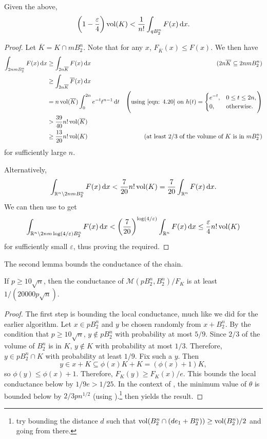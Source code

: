 \begin{lemma}
	\label{lem 4.45}
	Given the above,
	\[ \left(1-\frac{\varepsilon}{4}\right)\operatorname{vol}(K) < \frac{1}{n!} \int_{qB_2^n} F(x)\operatorname{d}\!{x}. \]
\end{lemma}
\begin{proof}
	Let $\overline{K}=K\cap m B_2^n$. Note that for any $x$, $F_{\overline{K}}(x) \leq F(x)$. We then have
	\begin{align*}
		\int_{2nmB_2^n} F(x)\d{x} &\geq \int_{2n\overline{K}} F(x)\d{x} & (2n\overline{K}\subseteq 2nmB_2^n) \\
			&\geq \int_{2n\overline{K}} \overline{F}(x)\d{x} \\
			&= n\vol(\overline{K}) \int_0^{2n} e^{-t}t^{n-1}\d{t} & \left(\text{using \Cref{eqn: 4.20} on $h(t) = \begin{cases} e^{-t}, & 0\leq t\leq 2n, \\ 0, & \text{otherwise.} \end{cases}$}\right) \\
			&> \frac{39}{40} n! \vol(\overline{K}) \\
			&\geq \frac{13}{20} n!\vol(K) & (\text{at least $2/3$ of the volume of $K$ is in $mB_2^n$})
	\end{align*}
	for sufficiently large $n$.

	Alternatively,
	\[ \int_{\mathbb{R}^n \setminus 2nmB_2^n} F(x)\operatorname{d}\!{x} < \frac{7}{20} n! \operatorname{vol}(K) = \frac{7}{20} \int_{\mathbb{R}^n} F(x)\operatorname{d}\!{x}. \]
	We can then use  to get
	\[ \int_{\mathbb{R}^n\setminus 2nm\log(4/\varepsilon)B_2^n} F(x)\operatorname{d}\!{x} < \left(\frac{7}{20}\right)^{\log(4/\varepsilon)} \int_{\mathbb{R}^n} F(x)\operatorname{d}\!{x} \leq \frac{\varepsilon}{4} n! \operatorname{vol}(K) \]
	for sufficiently small $\varepsilon$, thus proving the required.
\end{proof}

The second lemma bounds the conductance of the chain.

\begin{lemma}
	\label{lem 4.46}
	If $p\geq 10\sqrt{n}$, then the conductance of $\mathcal{M}(pB_2^n, B_2^n)/F_K$ is at least $1/(20000p\sqrt{n})$.
\end{lemma}

\begin{proof}
	The first step is bounding the local conductance, much like we did for the earlier algorithm. Let $x\in pB_2^n$ and $y$ be chosen randomly from $x+B_2^n$. By the condition that $p\geq 10\sqrt{n}$, $y\not\in pB_2^n$ with probability at most $5/9$. Since $2/3$ of the volume of $B_2^n$ is in $K$, $y\not\in K$ with probability at most $1/3$. Therefore, $y\in pB_2^n\cap K$ with probability at least $1/9$. Fix such a $y$. Then
	\[ y\in x+K\subseteq \phi(x)K + K = (\phi(x)+1)K, \]
	so $\phi(y)\leq\phi(x)+1$. Therefore, $F_K(y)\geq F_K(x)/e$. This bounds the local conductance below by $1/9e > 1/25$. In the context of , the minimum value of $\theta$ is bounded below by $2/3pn^{1/2}$ (using ).\footnote{try bounding the distance $d$ such that $\operatorname{vol}(B_2^n \cap (de_1 + B_2^n)) \geq \operatorname{vol}(B_2^n)/2$ and going from there.}  then yields the result.
\end{proof}

